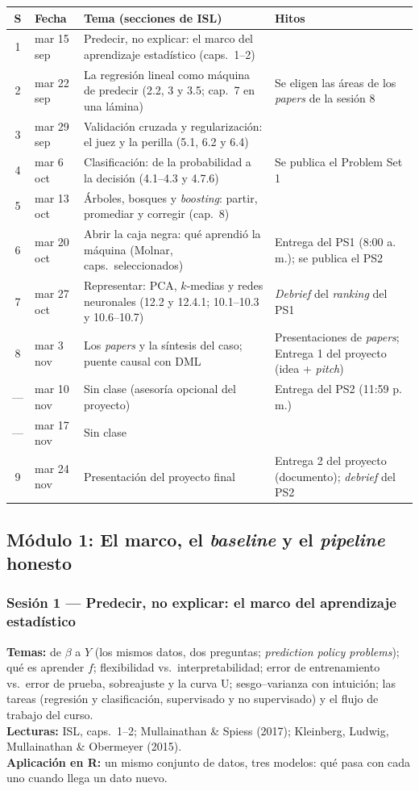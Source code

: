 \documentclass[12pt,a4paper]{article}
\begin{document}
\begin{center}
\small
\begin{tabular}{@{}clp{6.2cm}p{4.7cm}@{}}
\toprule
S & Fecha & Tema (secciones de ISL) & Hitos \\
\midrule
1 & mar 15 sep & Predecir, no explicar: el marco del aprendizaje estadístico (caps.\ 1--2) & \\
2 & mar 22 sep & La regresión lineal como máquina de predecir (2.2, 3 y 3.5; cap.\ 7 en una lámina) & Se eligen las áreas de los \emph{papers} de la sesión 8 \\
3 & mar 29 sep & Validación cruzada y regularización: el juez y la perilla (5.1, 6.2 y 6.4) & \\
4 & mar 6 oct & Clasificación: de la probabilidad a la decisión (4.1--4.3 y 4.7.6) & Se publica el Problem Set 1 \\
5 & mar 13 oct & Árboles, bosques y \emph{boosting}: partir, promediar y corregir (cap.\ 8) & \\
6 & mar 20 oct & Abrir la caja negra: qué aprendió la máquina (Molnar, caps.\ seleccionados) & Entrega del PS1 (8:00 a.\,m.); se publica el PS2 \\
7 & mar 27 oct & Representar: PCA, $k$-medias y redes neuronales (12.2 y 12.4.1; 10.1--10.3 y 10.6--10.7) & \emph{Debrief} del \emph{ranking} del PS1 \\
8 & mar 3 nov & Los \emph{papers} y la síntesis del caso; puente causal con DML & Presentaciones de \emph{papers}; Entrega 1 del proyecto (idea + \emph{pitch}) \\
--- & mar 10 nov & Sin clase (asesoría opcional del proyecto) & Entrega del PS2 (11:59 p.\,m.) \\
--- & mar 17 nov & Sin clase & \\
9 & mar 24 nov & Presentación del proyecto final & Entrega 2 del proyecto (documento); \emph{debrief} del PS2 \\
\bottomrule
\end{tabular}
\end{center}

\subsection{Módulo 1: El marco, el \emph{baseline} y el \emph{pipeline} honesto}

\subsubsection{Sesión 1 --- Predecir, no explicar: el marco del aprendizaje estadístico}
\textbf{Temas:} de $\beta$ a $Y$ (los mismos datos, dos preguntas; \emph{prediction policy problems}); qué es aprender $f$; flexibilidad vs.\ interpretabilidad; error de entrenamiento vs.\ error de prueba, sobreajuste y la curva U; sesgo--varianza con intuición; las tareas (regresión y clasificación, supervisado y no supervisado) y el flujo de trabajo del curso. \\
\textbf{Lecturas:} ISL, caps.\ 1--2; Mullainathan \& Spiess (2017); Kleinberg, Ludwig, Mullainathan \& Obermeyer (2015). \\
\textbf{Aplicación en R:} un mismo conjunto de datos, tres modelos: qué pasa con cada uno cuando llega un dato nuevo.
\end{document}
